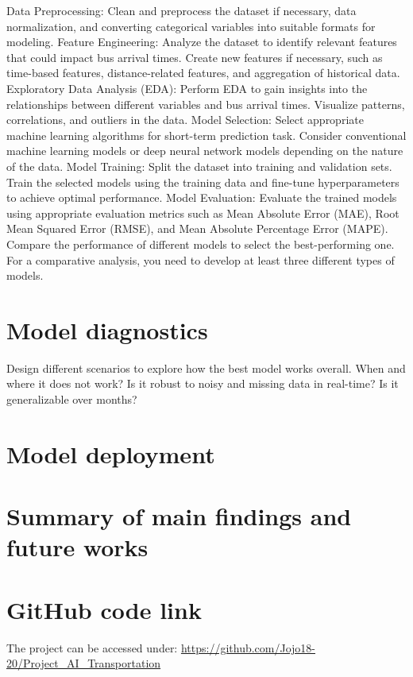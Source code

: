 	Data Preprocessing: Clean and preprocess the dataset if necessary, data normalization, and converting categorical variables into suitable formats for modeling.
	Feature Engineering: Analyze the dataset to identify relevant features that could impact bus arrival times. Create new features if necessary, such as time-based features, distance-related features, and aggregation of historical data.
	Exploratory Data Analysis (EDA): Perform EDA to gain insights into the relationships between different variables and bus arrival times. Visualize patterns, correlations, and outliers in the data.
	Model Selection: Select appropriate machine learning algorithms for short-term prediction task. Consider conventional machine learning models or deep neural network models depending on the nature of the data. 
	Model Training: Split the dataset into training and validation sets. Train the selected models using the training data and fine-tune hyperparameters to achieve optimal performance.
	Model Evaluation: Evaluate the trained models using appropriate evaluation metrics such as Mean Absolute Error (MAE), Root Mean Squared Error (RMSE), and Mean Absolute Percentage Error (MAPE). Compare the performance of different models to select the best-performing one. For a comparative analysis, you need to develop at least three different types of models. 
	\section{Model diagnostics}
	
	Design different scenarios to explore how the best model works overall. When and where it does not work? Is it robust to noisy and missing data in real-time? Is it generalizable over months?  
	
	\section{Model deployment}  
	
	
	
	
	\section{Summary of main findings and future works}
	
	
	\appendix
	
	\section{GitHub code link}
	The project can be accessed under:
	\url{https://github.com/Jojo18-20/Project_AI_Transportation}
	
